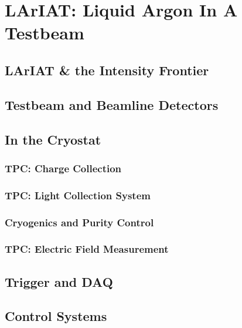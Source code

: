 \chapter{LArIAT: Liquid Argon In A Testbeam}
\section{LArIAT \& the Intensity Frontier}
\section{Testbeam and Beamline Detectors}
\section{In the Cryostat}

\subsection{TPC: Charge Collection}
\subsection{TPC: Light Collection System}
\subsection{Cryogenics and Purity Control}
\subsection{TPC: Electric Field Measurement}
\section{Trigger and DAQ}
\section{Control Systems}
